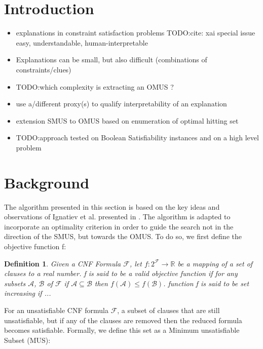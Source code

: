 \documentclass{article}
\newcommand\m[1]{\mathcal{#1}}
\newtheorem{definition}[thm]{Definition}
\newcommand\comment[1]{\marginpar{\tiny #1}}
\renewcommand\comment[1]{#1}
\newcommand{\emilio}[1]{{\comment{\color{red}#1}}}
\newcommand{\todo}[1]{{\comment{\color{red}\textsc{TODO:}#1}}}
\begin{document}
\section{Introduction}
\begin{itemize}
  \item explanations in constraint satisfaction problems \todo{cite: xai special issue} easy, understandable, human-interpretable
  \item Explanations can be small, but also difficult (combinations of constraints/clues)
  \item \todo{which complexity is extracting an OMUS ?}
  \item use a/different proxy(s) to qualify interpretability of an explanation
  \item extension SMUS to OMUS based on enumeration of optimal hitting set
  \item \todo{approach tested on Boolean Satisfiability instances and on a high level problem}
\end{itemize}

\section{Background}

The algorithm presented in this section is based on the key ideas and observations of Ignatiev et al. presented in \cite{ignatiev2015smallest}.
The algorithm is adapted to incorporate an optimality criterion in order to guide the search not in the direction of the SMUS, but towards the OMUS. 
To do so, we first define the  objective function f:

\begin{definition}
  Given a CNF Formula $\m{F}$, let $f : 2^{\m{F}} \rightarrow \mathbb{R}$ be a mapping of a set of clauses to a real number. f is said to be a valid objective function if for any subsets $\m{A}$, $\m{B}$ of $\m{F}$ if $\m{A} \subseteq \m{B}$ then $f(\m{A}) \leq f(\m{B})$.
  \emilio{function f is said to be set increasing if ...}
\end{definition}

For an unsatisfiable CNF formula $\m{F}$, a subset of clauses that are still unsatisfiable, but if any of the clauses are removed then the reduced formula becomes satisfiable. 
Formally, we define this set as a Minimum unsatisfiable Subset (MUS):
\end{document}
